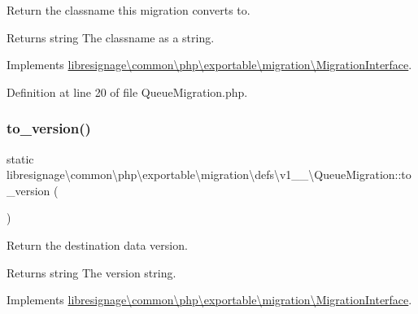 Return the classname this migration converts to.

\begin{DoxyReturn}{Returns}
string The classname as a string. 
\end{DoxyReturn}


Implements \hyperlink{interfacelibresignage_1_1common_1_1php_1_1exportable_1_1migration_1_1MigrationInterface_ab1f33cdd8684595d6b000bcbc7c4d5a4}{libresignage\textbackslash{}common\textbackslash{}php\textbackslash{}exportable\textbackslash{}migration\textbackslash{}\+Migration\+Interface}.



Definition at line 20 of file Queue\+Migration.\+php.

\mbox{\label{classlibresignage_1_1common_1_1php_1_1exportable_1_1migration_1_1defs_1_1v1__1__0_1_1QueueMigration_a305bfc95b0ba822fe91cde871bc05cab}} 
\subsubsection{\texorpdfstring{to\+\_\+version()}{to\_version()}}
{\footnotesize\ttfamily static libresignage\textbackslash{}common\textbackslash{}php\textbackslash{}exportable\textbackslash{}migration\textbackslash{}defs\textbackslash{}v1\+\_\+\_\textbackslash{}\+Queue\+Migration\+::to\+\_\+version (\begin{DoxyParamCaption}{ }\end{DoxyParamCaption})\hspace{0.3cm}{\ttfamily [static]}}

Return the destination data version.

\begin{DoxyReturn}{Returns}
string The version string. 
\end{DoxyReturn}


Implements \hyperlink{interfacelibresignage_1_1common_1_1php_1_1exportable_1_1migration_1_1MigrationInterface_a9eddabf63771d4d1081bd6d067c7dff5}{libresignage\textbackslash{}common\textbackslash{}php\textbackslash{}exportable\textbackslash{}migration\textbackslash{}\+Migration\+Interface}.



